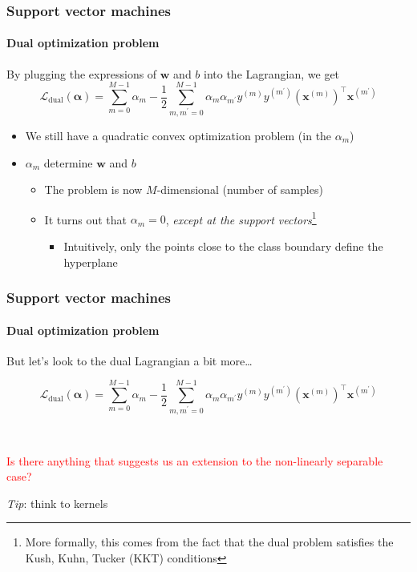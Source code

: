 \documentclass[aspectratio=43]{beamer}
\begin{document}
\begin{frame}
  \frametitle{Support vector machines}
  \framesubtitle{Dual optimization problem}

  By plugging the expressions of $\mathbf{w}$ and $b$ into the Lagrangian, we get
  \[\mathcal{L}_{\mathrm{dual}}\left( \mathbf{\alpha} \right) = \sum_{m=0}^{M-1}\alpha_m - \frac{1}{2}\sum_{m,m^\prime=0}^{M-1}\alpha_m\alpha_{m^\prime}y^{(m)}y^{(m^\prime)}\left( \mathbf{x}^{(m)} \right)^\top \mathbf{x}^{(m^\prime)}\]

  \begin{itemize}
    \item We still have a quadratic convex optimization problem (in the $\alpha_m$)
    \item $\alpha_m$ determine $\mathbf{w}$ and $b$
    \begin{itemize}
      \item The problem is now $M$-dimensional (number of samples)
      \item It turns out that $\alpha_m=0$, \emph{except at the support vectors}\footnote{More formally, this comes from the fact that the dual problem satisfies the Kush, Kuhn, Tucker (KKT) conditions}
      \begin{itemize}
        \item Intuitively, only the points close to the class boundary define the hyperplane
      \end{itemize}
    \end{itemize}
  \end{itemize}

\end{frame}


\begin{frame}
  \frametitle{Support vector machines}
  \framesubtitle{Dual optimization problem}
  
  But let's look to the dual Lagrangian a bit more\dots

  \[\mathcal{L}_{\mathrm{dual}}\left( \mathbf{\alpha} \right) = \sum_{m=0}^{M-1}\alpha_m - \frac{1}{2}\sum_{m,m^\prime=0}^{M-1}\alpha_m\alpha_{m^\prime}y^{(m)}y^{(m^\prime)}\left( \mathbf{x}^{(m)} \right)^\top \mathbf{x}^{(m^\prime)}\]

  \ \\
  \begin{center}
    \textcolor{red}{Is there anything that suggests us an extension to the non-linearly separable case?}

    \emph{Tip}: think to kernels
  \end{center}

  
\end{frame}
\end{document}
